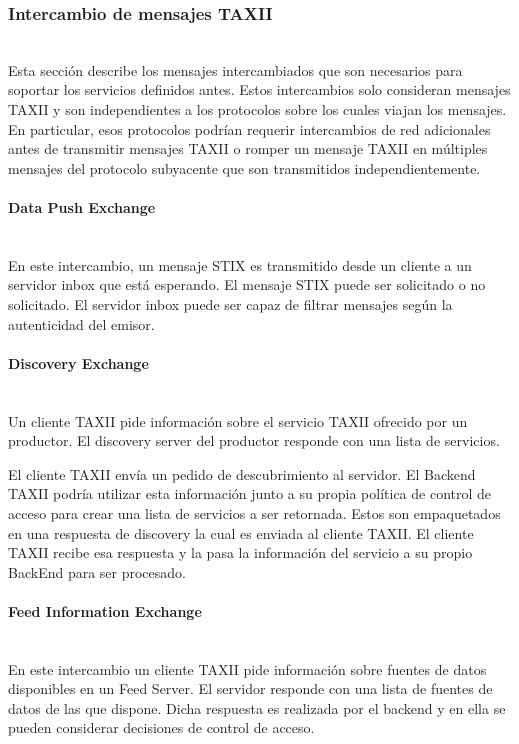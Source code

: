\subsubsection{Intercambio de mensajes TAXII}\ \\

Esta sección describe los mensajes intercambiados que son necesarios para soportar 
los servicios definidos antes. Estos intercambios solo consideran mensajes 
TAXII y son independientes a los protocolos sobre los cuales viajan los mensajes.
 En particular, esos protocolos podrían requerir intercambios de red 
adicionales antes de transmitir mensajes TAXII o romper un mensaje TAXII en 
múltiples mensajes del protocolo subyacente que son transmitidos 
independientemente.

\paragraph{Data Push Exchange}\ \\
En este intercambio, un mensaje STIX es transmitido desde un cliente a un 
servidor inbox que está esperando. El mensaje STIX puede ser solicitado o no 
solicitado. El servidor inbox puede ser capaz de filtrar mensajes según la 
autenticidad del emisor.

\paragraph{Discovery Exchange}\ \\

Un cliente TAXII pide información sobre el servicio TAXII ofrecido por un 
productor. El discovery server del productor responde con una lista de 
servicios. 

El cliente TAXII envía un pedido de descubrimiento al servidor. El Backend TAXII podría utilizar esta 
información junto a su propia política de control de acceso  para crear una 
lista de servicios a ser retornada. Estos son empaquetados en una 
respuesta de discovery la cual es enviada al cliente TAXII. El 
cliente TAXII recibe esa respuesta y la pasa la información del servicio a su 
propio BackEnd para ser procesado.

\paragraph{Feed Information Exchange}\ \\

En este intercambio un cliente TAXII pide información sobre fuentes de datos disponibles en 
un Feed Server. El servidor responde con una lista de fuentes de datos 
de las que dispone. Dicha respuesta es realizada por el backend y en ella se pueden considerar decisiones de control de acceso.\\

